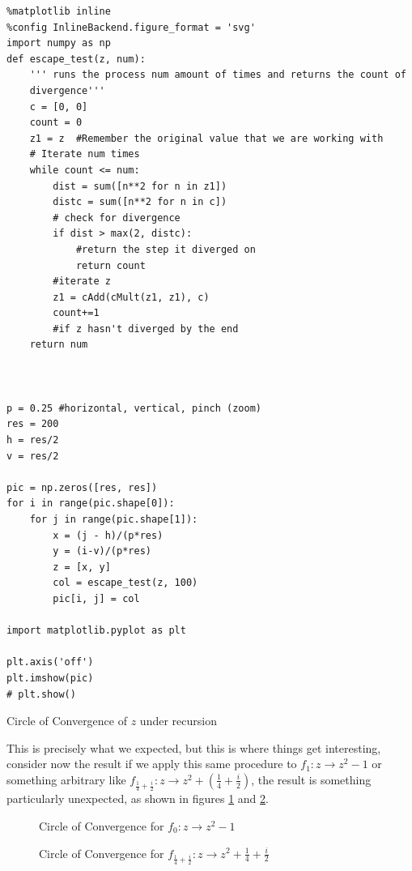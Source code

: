 \documentclass[11pt]{article}
\begin{document}
\begin{listing}[htbp]
\begin{verbatim}
%matplotlib inline
%config InlineBackend.figure_format = 'svg'
import numpy as np
def escape_test(z, num):
    ''' runs the process num amount of times and returns the count of
    divergence'''
    c = [0, 0]
    count = 0
    z1 = z  #Remember the original value that we are working with
    # Iterate num times
    while count <= num:
        dist = sum([n**2 for n in z1])
        distc = sum([n**2 for n in c])
        # check for divergence
        if dist > max(2, distc):
            #return the step it diverged on
            return count
        #iterate z
        z1 = cAdd(cMult(z1, z1), c)
        count+=1
        #if z hasn't diverged by the end
    return num



p = 0.25 #horizontal, vertical, pinch (zoom)
res = 200
h = res/2
v = res/2

pic = np.zeros([res, res])
for i in range(pic.shape[0]):
    for j in range(pic.shape[1]):
        x = (j - h)/(p*res)
        y = (i-v)/(p*res)
        z = [x, y]
        col = escape_test(z, 100)
        pic[i, j] = col

import matplotlib.pyplot as plt

plt.axis('off')
plt.imshow(pic)
# plt.show()

\end{verbatim}
\caption{\label{py-circle-code}Circle of Convergence of \(z\) under recursion}
\end{listing}


This is precisely what we expected, but this is where things get interesting,
consider now the result if we apply this same procedure to \(f_{1}: z \rightarrow
z^{2} - 1\) or something arbitrary like \(f_{\frac{1}{4} + \frac{i}{2}}: z
\rightarrow z^{2} + (\frac{1}{4} + \frac{i}{2})\), the result is something
particularly unexpected, as shown in figures \ref{py-jl-1-plot} and \ref{py-jl-rab-plot}.


\begin{figure}[htbp]
\centering

\caption{\label{py-jl-1-plot}Circle of Convergence for \(f_{0}: z \rightarrow z^{2} - 1\)}
\end{figure}


\begin{figure}[htbp]
\centering

\caption{\label{py-jl-rab-plot}Circle of Convergence for \(f_{\frac{1}{4} + \frac{i}{2}}: z \rightarrow z^{2} + \frac{1}{4} + \frac{i}{2}\)}
\end{figure}
\end{document}
